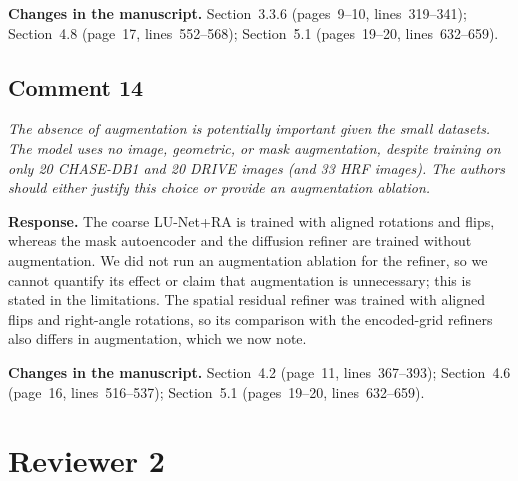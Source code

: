\documentclass[11pt,a4paper]{article}
\newenvironment{revcomment}{\par\medskip\noindent\begin{minipage}{\linewidth}\itshape}{\end{minipage}\par\smallskip}
\begin{document}
\textbf{Changes in the manuscript.} Section~3.3.6 (pages~9--10, lines~319--341); Section~4.8 (page~17, lines~552--568); Section~5.1 (pages~19--20, lines~632--659).

\subsection*{Comment 14}
\begin{revcomment}The absence of augmentation is potentially important given the small datasets. The model uses no image, geometric, or mask augmentation, despite training on only 20 CHASE-DB1 and 20 DRIVE images (and 33 HRF images). The authors should either justify this choice or provide an augmentation ablation.\end{revcomment}
\textbf{Response.} The coarse LU-Net+RA is trained with aligned rotations and flips, whereas the mask autoencoder and the diffusion refiner are trained without augmentation. We did not run an augmentation ablation for the refiner, so we cannot quantify its effect or claim that augmentation is unnecessary; this is stated in the limitations. The spatial residual refiner was trained with aligned flips and right-angle rotations, so its comparison with the encoded-grid refiners also differs in augmentation, which we now note.

\textbf{Changes in the manuscript.} Section~4.2 (page~11, lines~367--393); Section~4.6 (page~16, lines~516--537); Section~5.1 (pages~19--20, lines~632--659).

\section*{Reviewer 2}
\end{document}
